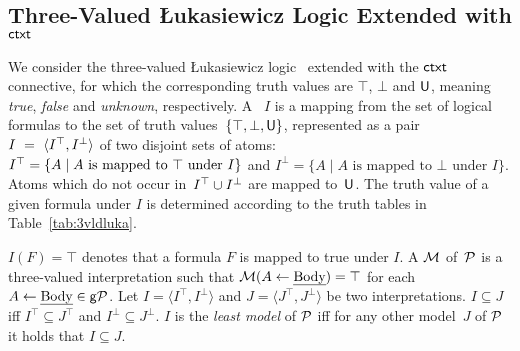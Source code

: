\documentclass[12pt]{article}
\begin{document}
\subsection{Three-Valued {\L}ukasiewicz Logic Extended with $\mathsf{ctxt}$} \label{sub:3valuedL}

We consider the three-valued {\L}ukasiewicz logic~\cite{lukasiewicz:20}
extended with the $\mathsf{ctxt}$ connective, for which the
corresponding truth values are $\top$, $\bot$ and $\mathsf{U}$, meaning \textit{true}, \textit{false}
and \textit{unknown}, respectively.
A ~$I$ is a mapping from the set of
logical formulas to the set
of truth values~$\{ \mathbf{\top}, \bot, \mathsf{U}\}$, represented as a pair~$I~=~\langle I^{\mathbf{\top}},I^\bot \rangle$ of two disjoint sets of atoms:  $I^{\mathbf{\top}} =  \{A \mid A \mbox{ is mapped to } \mathbf{\top} \mbox{ under } I\}$ and $I^\bot = \{A \mid A \mbox{ is mapped to } \bot \mbox{ under } I \}$.
Atoms which do not occur in~$I^{\mathbf{\top}} \cup I^\bot$ are mapped to~$\mathsf{U}$.
The truth value of a given formula
under $I$ is determined according to the truth tables in
Table~\ref{tab:3vldluka}.

$I(F) = \top$ denotes that a formula $F$ is mapped to true under $I$.
A  ${\cal M}$ of~${\cal P}$ is a three-valued interpretation such that
${\cal M}(A \leftarrow \mbox{\em Body}) = \mathbf{\top}$ for each $A \leftarrow \mbox{\em Body} \in \mathsf{g}{\cal P}$.
Let $I = \langle I^\top, I^\bot \rangle$ and $J = \langle J^\top,
J^\bot \rangle$ be two interpretations.
$I \subseteq J$ iff $I^\top \subseteq J^\top$ and $I^\bot \subseteq J^\bot$. $I$ is the \textit{least model} of ${\cal P}$
iff for any other model~$J$ of ${\cal P}$ it holds that $I \subseteq J$.
\end{document}
